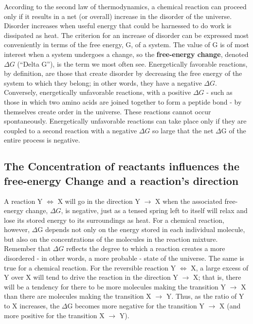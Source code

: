 According to the second law of thermodynamics, a chemical reaction
can proceed only if it results in a net (or overall) increase in the disorder
of the universe. Disorder increases when useful
energy that could be harnessed to do work is dissipated as heat. The
criterion for an increase of disorder can be expressed most conveniently
in terms of the free energy, G, of a system. The value of G is of most
interest when a system undergoes a change, so the \textbf{free-energy change},
denoted $\Delta G$ (“Delta G”), is the term we most often see.
Energetically favorable reactions, by definition, are those that create disorder
by decreasing the free energy of the system to which they belong; in
other words, they have a negative $\Delta G$. Conversely, energetically unfavorable reactions, with a positive
$\Delta G$ - such as those in which two amino acids are joined together to form
a peptide bond - by themselves create order in the universe. These reactions
cannot occur spontaneously. Energetically unfavorable reactions
can take place only if they are coupled to a second reaction with a negative
$\Delta G$ so large that the net $\Delta$G of the entire process is negative.

\subsection{The Concentration of reactants influences the free-energy Change and a reaction’s direction}

A reaction Y $\Longleftrightarrow$ X will go in the direction Y $\rightarrow$ X
when the associated free-energy change, $\Delta G$, is negative, just as a tensed
spring left to itself will relax and lose its stored energy to its surroundings
as heat. For a chemical reaction, however, $\Delta$G depends not only on the
energy stored in each individual molecule, but also on the concentrations
of the molecules in the reaction mixture. Remember that $\Delta G$ reflects the
degree to which a reaction creates a more disordered - in other words, a
more probable - state of the universe.
The same is true for a chemical reaction. For the reversible reaction Y $\Longleftrightarrow$
X, a large excess of Y over X will tend to drive the reaction in the direction
Y $\rightarrow$ X; that is, there will be a tendency for there to be more molecules
making the transition Y $\rightarrow$ X than there are molecules making the transition
X $\rightarrow$ Y. Thus, as the ratio of Y to X increases, the $\Delta$G becomes more negative
for the transition Y $\rightarrow$ X (and more positive for the transition X $\rightarrow$ Y).

